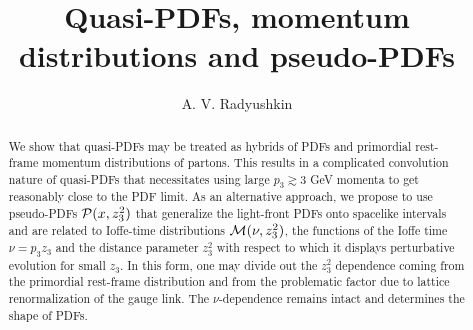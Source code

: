 \documentclass[aps,prd,twocolumn,showpacs,preprintnumbers,superscriptaddress,groupedaddress]{revtex4-1}
\begin{document}

\title{Quasi-PDFs, momentum  distributions   and pseudo-PDFs}

\author{A. V. Radyushkin} 


      
        



         
                        
\begin{abstract}


We  show that  quasi-PDFs may be  treated  as hybrids of PDFs and 
primordial rest-frame 
momentum distributions of partons. 
 This results in a   complicated  convolution  nature of quasi-PDFs that 
necessitates  using  large $p_3 \gtrsim 3$ GeV 
momenta  to 
 get reasonably close to the PDF limit.
 As  an alternative approach,
 we propose   to use 
pseudo-PDFs  ${\cal P}(x, z_3^2)$   that generalize
the light-front PDFs   onto spacelike intervals and  are related to 
 Ioffe-time  distributions  ${\cal M} (\nu, z_3^2)$, the  functions of   
  the Ioffe time  $\nu = p_3 z_3$ and the distance parameter $z_3^2$
  with respect to which it displays perturbative evolution for small $z_3$. 
 In this form, one may  
 divide   out  the   $z_3^2$   dependence  coming from the primordial rest-frame 
 distribution 
 and from the  problematic   factor  due to   lattice renormalization  of the  gauge link.  
 The $\nu$-dependence remains intact and determines the shape of PDFs. 
 





              
\end{abstract}
      



\maketitle
\end{document}
